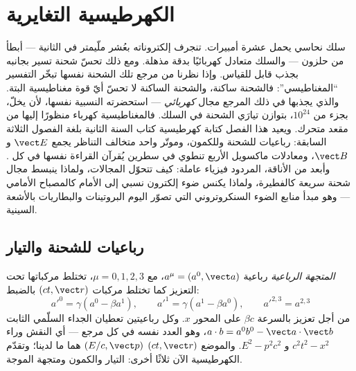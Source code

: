 \chapter{الكهرطيسية التغايرية}\label{ch:b3:covariant-electromagnetism}

سلك نحاسي يحمل عشرة أمبيرات. تنجرف إلكتروناته بعُشر ملّيمتر في
الثانية --- أبطأ من حلزون --- والسلك متعادل كهربائيًا بدقة
مذهلة. ومع ذلك تحسّ شحنة تسير بجانبه بجذب قابل للقياس. وإذا
نظرنا من مرجع تلك الشحنة نفسها تبخّر التفسير ``المغناطيسي'':
فالشحنة ساكنة، والشحنة الساكنة لا تحسّ أيّ قوة مغناطيسية البتة.
والذي يجذبها في ذلك المرجع مجال \emph{كهربائي} --- استحضرته
النسبية نفسها، لأن  يخلّ، بجزء من
$10^{24}$، بتوازن تيارَي الشحنة في السلك. فالمغناطيسية كهرباء
منظورًا إليها من مقعد متحرك. ويعيد هذا الفصل كتابة
كهرطيسية كتاب السنة الثانية بلغة الفصول الثلاثة السابقة:
رباعيات للشحنة وللكمون، وموتّر واحد متخالف التناظر يجمع
$\vect E$ و $\vect B$، ومعادلات ماكسويل الأربع تنطوي في سطرين
يُقرآن القراءة نفسها في كل . وأبعد من الأناقة، المردود
فيزياء عاملة: كيف تتحوّل المجالات، ولماذا ينبسط مجال شحنة سريعة
كالفطيرة، ولماذا يكنس ضوء إلكترون نسبي إلى الأمام كالمصباح
الأمامي --- وهو مبدأ منابع الضوء السنكروتروني التي تصوّر اليوم
البروتينات والبطاريات بالأشعة السينية.

\section{رباعيات للشحنة والتيار}

\begin{definition}[الرباعيات]\label{def:b3:covariant-electromagnetism:fourvector}
\emph{المتجهة الرباعية} رباعية $a^\mu = (a^0, \vect a)$، مع $\mu =
0, 1, 2, 3$، تختلط مركباتها تحت التعزيز كما تختلط مركبات $(ct,
\vect r)$ بالضبط:
\[
a'^0 = \gamma(a^0 - \beta a^1) , \qquad
a'^1 = \gamma(a^1 - \beta a^0) , \qquad
a'^{2,3} = a^{2,3}
\]
من أجل تعزيز بالسرعة $\beta c$ على المحور $x$. وكل رباعيتين تعطيان
الجداء السلّمي الثابت $a\cdot b = a^0b^0 - \vect a\cdot\vect b$،
وهو العدد نفسه في كل مرجع --- أي النقش وراء $c^2t^2 - x^2$
و $E^2 - p^2c^2$. والموضع $(ct, \vect r)$ 
$(E/c, \vect p)$ هما ما لدينا؛ وتقدّم الكهرطيسية الآن
ثلاثًا أخرى: التيار والكمون ومتجهة الموجة.
\end{definition}

